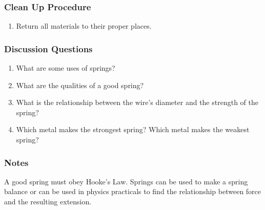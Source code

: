 \subsubsection*{Clean Up Procedure}
\begin{enumerate}
\item{Return all materials to their proper places.}
\end{enumerate}

\subsubsection*{Discussion Questions}
\begin{enumerate}
\item{What are some uses of springs?}
\item{What are the qualities of a good spring?}
\item{What is the relationship between the wire's diameter and the strength of the spring?}
\item{Which metal makes the strongest spring?  Which metal makes the weakest spring?}
\end{enumerate}

\subsubsection*{Notes}
A good spring must obey Hooke's Law.  Springs can be used to make a spring balance or can be used in physics practicals to find the relationship between force and the resulting extension.
